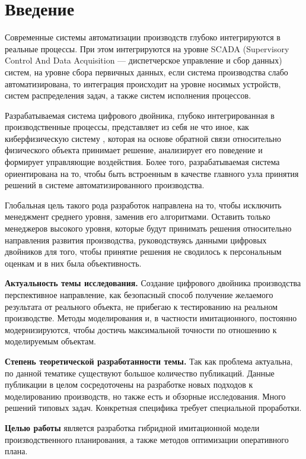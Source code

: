\section*{Введение}
Современные системы автоматизации производств глубоко интегрируются в реальные процессы. При этом интегрируются на уровне SCADA (Supervisory Control And Data Acquisition — диспетчерское управление и сбор данных) систем, на уровне сбора первичных данных, если система производства слабо автоматизирована, то интеграция происходит на уровне носимых устройств, систем распределения задач, а также систем исполнения процессов.

Разрабатываемая система цифрового двойника, глубоко интегрированная в производственные процессы, представляет из себя не что иное, как киберфизическую систему \cite{Goncharov} \cite{industry}, которая на основе обратной связи относительно физического объекта принимает решение, анализирует его поведение и формирует управляющие воздействия. Более того, разрабатываемая система ориентирована на то, чтобы быть встроенным в качестве главного узла принятия решений в системе автоматизированного производства.

Глобальная цель такого рода разработок направлена на то, чтобы исключить менеджмент среднего уровня, заменив его алгоритмами. Оставить только менеджеров высокого уровня, которые будут принимать решения относительно направления развития производства, руководствуясь данными цифровых двойников для того, чтобы принятие решения не сводилось к персональным оценкам и в них была объективность.


\newpage

\textbf{Актуальность темы исследования.} Создание цифрового двойника производства перспективное направление, как безопасный способ получение желаемого результата от реального объекта, не прибегаю к тестированию на реальном производстве. Методы моделирования и, в частности имитационного, постоянно модернизируются, чтобы достичь максимальной точности по отношению к моделируемым объектам.

\textbf{Степень теоретической разработанности темы.} Так как проблема актуальна, по данной тематике существуют большое количество публикаций. Данные публикации в целом сосредоточены на разработке новых подходов к моделированию производств, но также есть и обзорные исследования. Много решений типовых задач. Конкретная специфика требует специальной проработки.

\textbf{Целью работы} является разработка гибридной имитационной модели производственного планирования, а также методов оптимизации оперативного плана.

